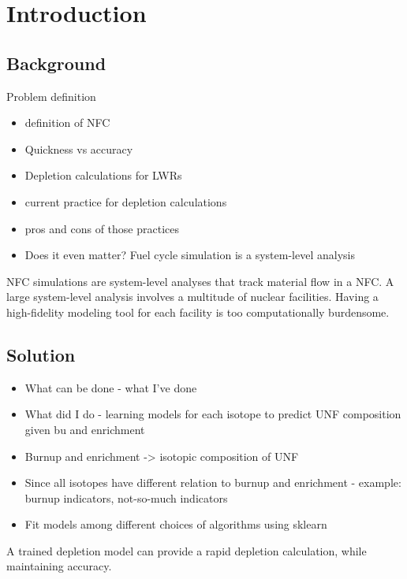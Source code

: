\section{Introduction}
\subsection{Background}
Problem definition
\begin{itemize}
    \item definition of NFC
    \item Quickness vs accuracy
    \item Depletion calculations for LWRs
    \item current practice for depletion calculations
    \item pros and cons of those practices
    \item Does it even matter? Fuel cycle simulation is a system-level analysis
\end{itemize}

\gls{NFC} simulations are system-level analyses that track
material flow in a \gls{NFC}. A large system-level analysis
involves a multitude of nuclear facilities. Having a high-fidelity
modeling tool for each facility is too computationally burdensome.



\subsection{Solution}
\begin{itemize}
    \item What can be done - what I've done
    \item What did I do - learning models for each isotope to predict UNF composition given bu and enrichment
    \item Burnup and enrichment -> isotopic composition of UNF
    \item Since all isotopes have different relation to burnup and enrichment
            - example: burnup indicators, not-so-much indicators
    \item Fit models among different choices of algorithms using sklearn
\end{itemize}

A trained depletion model can provide a rapid depletion calculation, while
maintaining accuracy.
